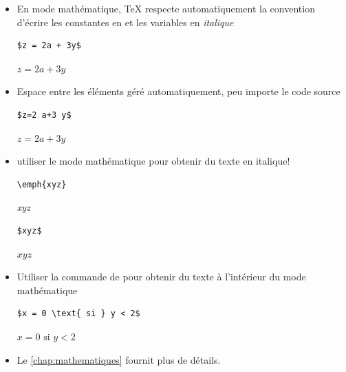\begin{itemize}
\item En mode mathématique, {\TeX} respecte automatiquement la
  convention d'écrire les constantes en  et les
  variables en \textit{italique}
  \begin{demo}
    \begin{texample}
\begin{lstlisting}
$z = 2a + 3y$
\end{lstlisting}
      \producing
      $z = 2a + 3y$
    \end{texample}
  \end{demo}
\item Espace entre les éléments géré automatiquement, peu importe le
  code source
  \begin{demo}
    \begin{texample}
\begin{lstlisting}
$z=2 a+3 y$
\end{lstlisting}
      \producing
      $z=2 a+3 y$
    \end{texample}
  \end{demo}
\item {} utiliser le mode mathématique pour obtenir du
  texte en italique!
  \begin{demo}
    \begin{texample}
\begin{lstlisting}
\emph{xyz}
\end{lstlisting}
      \producing
      \rmfamily\emph{xyz}
    \end{texample}
    \begin{texample}
\begin{lstlisting}
$xyz$
\end{lstlisting}
      \producing
      $xyz$
    \end{texample}
  \end{demo}
\item Utiliser la commande \cmd{\text} de  pour
  obtenir du texte à l'intérieur du mode mathématique
  \begin{demo}
    \begin{texample}
\begin{lstlisting}
$x = 0 \text{ si } y < 2$
\end{lstlisting}
      \producing
      $x = 0 \text{ si } y < 2$
    \end{texample}
  \end{demo}
\item Le \autoref{chap:mathematiques} fournit plus de détails.
\end{itemize}

